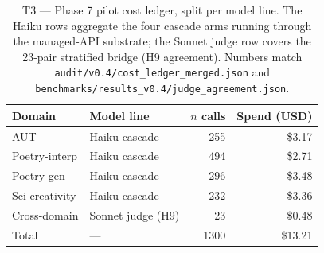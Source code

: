 \begin{table}[ht]
\centering
\caption{T3 --- Phase 7 pilot cost ledger, split per model line. The Haiku rows aggregate the four cascade arms running through the managed-API substrate; the Sonnet judge row covers the 23-pair stratified bridge (H9 agreement). Numbers match \nolinkurl{audit/v0.4/cost_ledger_merged.json} and \nolinkurl{benchmarks/results_v0.4/judge_agreement.json}.}
\label{tab:cost_split}
\begin{tabular}{llrr}
\toprule
Domain & Model line & $n$ calls & Spend (USD) \\
\midrule
  AUT & Haiku cascade & 255 & \$3.17 \\
  Poetry-interp & Haiku cascade & 494 & \$2.71 \\
  Poetry-gen & Haiku cascade & 296 & \$3.48 \\
  Sci-creativity & Haiku cascade & 232 & \$3.36 \\
  \midrule
  Cross-domain & Sonnet judge (H9) & 23 & \$0.48 \\
  \midrule
  Total & --- & 1300 & \$13.21 \\
\bottomrule
\end{tabular}
\end{table}
